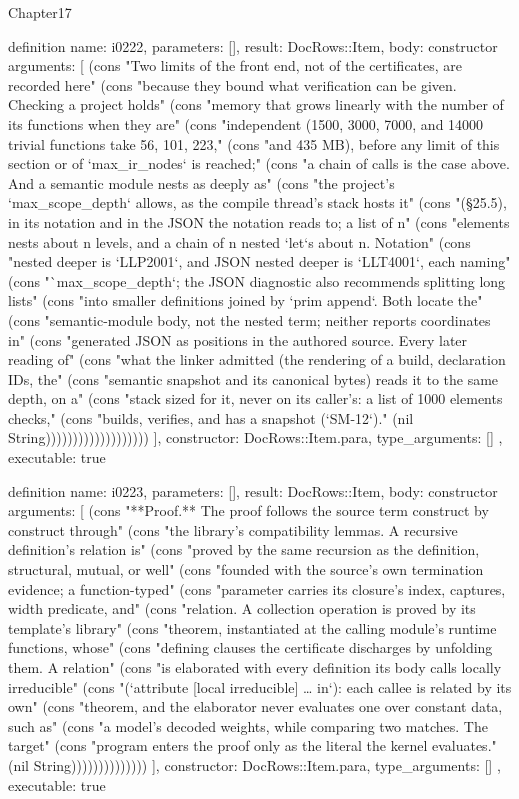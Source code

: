 \begin{lexlean}{Chapter17}
\begin{semanticmodule}
definition{
  name: i0222,
  parameters: [],
  result: DocRows::Item,
  body: constructor{
    arguments: [
      (cons "Two limits of the front end, not of the certificates, are recorded here" (cons "because they bound what verification can be given. Checking a project holds" (cons "memory that grows linearly with the number of its functions when they are" (cons "independent (1500, 3000, 7000, and 14000 trivial functions take 56, 101, 223," (cons "and 435 MB), before any limit of this section or of `max_ir_nodes` is reached;" (cons "a chain of calls is the case above. And a semantic module nests as deeply as" (cons "the project's `max_scope_depth` allows, as the compile thread's stack hosts it" (cons "(§25.5), in its notation and in the JSON the notation reads to; a list of n" (cons "elements nests about n levels, and a chain of n nested `let`s about n. Notation" (cons "nested deeper is `LLP2001`, and JSON nested deeper is `LLT4001`, each naming" (cons "`max_scope_depth`; the JSON diagnostic also recommends splitting long lists" (cons "into smaller definitions joined by `prim append`. Both locate the" (cons "semantic-module body, not the nested term; neither reports coordinates in" (cons "generated JSON as positions in the authored source. Every later reading of" (cons "what the linker admitted (the rendering of a build, declaration IDs, the" (cons "semantic snapshot and its canonical bytes) reads it to the same depth, on a" (cons "stack sized for it, never on its caller's: a list of 1000 elements checks," (cons "builds, verifies, and has a snapshot (`SM-12`)." (nil String)))))))))))))))))))
    ],
    constructor: DocRows::Item.para,
    type_arguments: []
  },
  executable: true
}

definition{
  name: i0223,
  parameters: [],
  result: DocRows::Item,
  body: constructor{
    arguments: [
      (cons "**Proof.** The proof follows the source term construct by construct through" (cons "the library's compatibility lemmas. A recursive definition's relation is" (cons "proved by the same recursion as the definition, structural, mutual, or well" (cons "founded with the source's own termination evidence; a function-typed" (cons "parameter carries its closure's index, captures, width predicate, and" (cons "relation. A collection operation is proved by its template's library" (cons "theorem, instantiated at the calling module's runtime functions, whose" (cons "defining clauses the certificate discharges by unfolding them. A relation" (cons "is elaborated with every definition its body calls locally irreducible" (cons "(`attribute [local irreducible] … in`): each callee is related by its own" (cons "theorem, and the elaborator never evaluates one over constant data, such as" (cons "a model's decoded weights, while comparing two matches. The target" (cons "program enters the proof only as the literal the kernel evaluates." (nil String))))))))))))))
    ],
    constructor: DocRows::Item.para,
    type_arguments: []
  },
  executable: true
}


\end{semanticmodule}
\end{lexlean}
